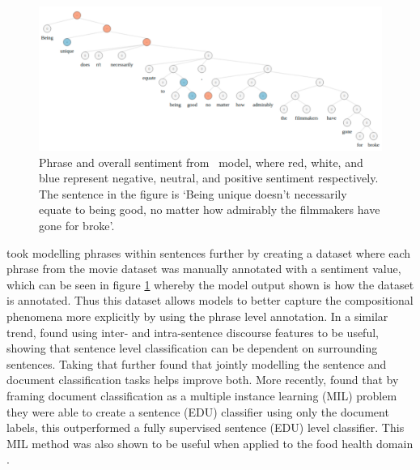 \begin{figure}[!h]
    \centering
    \includegraphics[scale=0.35]{images/lit_review/sentence_sentiment_example.pdf}
    \caption{Phrase and overall sentiment from~\citet{socher-etal-2013-recursive} model, where red, white, and blue represent negative, neutral, and positive sentiment respectively. The sentence in the figure is `Being unique doesn’t necessarily equate to being good, no matter how admirably the filmmakers have gone for broke'.}
    \label{fig:lit_review_sentence_sentiment_example}
\end{figure}

\citet{socher-etal-2013-recursive} took modelling phrases within sentences further by creating a dataset where each phrase from the \citet{pang-lee-2005-seeing} movie dataset was manually annotated with a sentiment value, which can be seen in figure \ref{fig:lit_review_sentence_sentiment_example} whereby the model output shown is how the dataset is annotated. Thus this dataset allows models to better capture the compositional phenomena more explicitly by using the phrase level annotation. In a similar trend, \citet{yang-cardie-2014-context} found using inter- and intra-sentence discourse features to be useful, showing that sentence level classification can be dependent on surrounding sentences. Taking that further \citet{mcdonald-etal-2007-structured} found that jointly modelling the sentence and document classification tasks helps improve both. More recently, \citet{angelidis-lapata-2018-multiple} found that by framing document classification as a multiple instance learning (MIL) \citep{dietterich1997solving} problem they were able to create a sentence (EDU) classifier using only the document labels, this outperformed a fully supervised sentence (EDU) level classifier. This MIL method was also shown to be useful when applied to the food health domain \citep{karamanolakis-etal-2019-weakly}.

